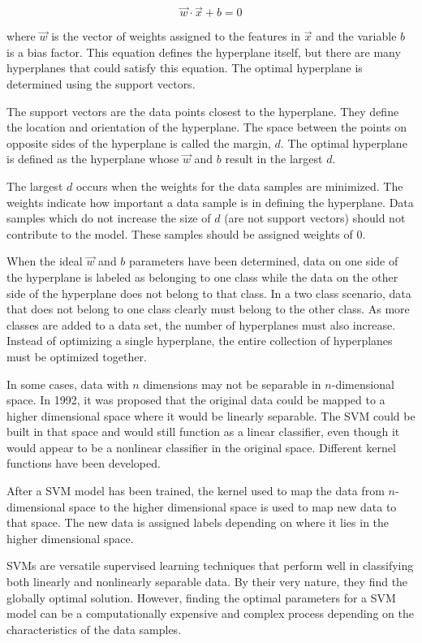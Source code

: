 \begin{equation}
\vec{w}\cdot\vec{x}+b = 0
\end{equation}

\noindent where $\vec{w}$ is the vector of weights assigned to the features in $\vec{x}$ and the variable $b$ is a bias factor. This equation defines the hyperplane itself, but there are many hyperplanes that could satisfy this equation. The optimal hyperplane is determined using the support vectors. 

The support vectors are the data points closest to the hyperplane. They define the location and orientation of the hyperplane. The space between the points on opposite sides of the hyperplane is called the margin, $d$. The optimal hyperplane is defined as the hyperplane whose $\vec{w}$ and $b$ result in the largest $d$.

The largest $d$ occurs when the weights for the data samples are minimized. The weights indicate how important a data sample is in defining the hyperplane. Data samples which do not increase the size of $d$ (are not support vectors) should not contribute to the model. These samples should be assigned weights of $0$.

When the ideal $\vec{w}$ and $b$ parameters have been determined, data on one side of the hyperplane is labeled as belonging to one class while the data on the other side of the hyperplane does not belong to that class. In a two class scenario, data that does not belong to one class clearly must belong to the other class. As more classes are added to a data set, the number of hyperplanes must also increase. Instead of optimizing a single hyperplane, the entire collection of hyperplanes must be optimized together.

In some cases, data with $n$ dimensions may not be separable in $n$-dimensional space. In 1992, it was proposed that the original data could be mapped to a higher dimensional space where it would be linearly separable. The SVM could be built in that space and would still function as a linear classifier, even though it would appear to be a nonlinear classifier in the original space. Different kernel functions have been developed. 

After a SVM model has been trained, the kernel used to map the data from $n$-dimensional space to the higher dimensional space is used to map new data to that space. The new data is assigned labels depending on where it lies in the higher dimensional space.  

SVMs are versatile supervised learning techniques that perform well in classifying both linearly and nonlinearly separable data. By their very nature, they find the globally optimal solution. However, finding the optimal parameters for a SVM model can be a computationally expensive and complex process depending on the characteristics of the data samples.

